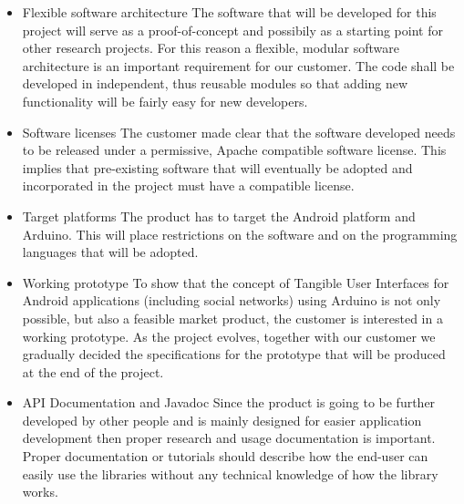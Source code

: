 \begin{itemize}
\item{Flexible software architecture}\newline
The software that will be developed for this project will serve as
a proof-of-concept and possibily as a starting point for other research
projects. For this reason a flexible, modular software architecture
is an important requirement for our customer. The code shall be developed
in independent, thus reusable modules so that adding new functionality
will be fairly easy for new developers.

\item{Software licenses}\newline
The customer made clear that the software developed needs to be released
under a permissive, Apache compatible software license. This implies
that pre-existing software that will eventually be adopted and incorporated
in the project must have a compatible license.

\item{Target platforms}\newline
The product has to target the Android platform and Arduino.
This will place restrictions on the software and on the programming languages that will be adopted.

\item{Working prototype}\newline
To show that the concept of Tangible User Interfaces for Android applications
(including social networks) using Arduino is not only possible, but
also a feasible market product, the customer is interested in a working
prototype. As the project evolves, together with our customer we
gradually decided the specifications for the prototype that will
be produced at the end of the project.

\item{API Documentation and Javadoc}\newline
Since the product is going to be further developed by other people and is
mainly designed for easier application development then proper research and usage
documentation is important. Proper documentation or tutorials should describe how
the end-user can easily use the libraries without any technical knowledge of how
the library works.
\end{itemize}